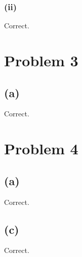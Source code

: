 \documentclass{article}
\begin{document}
\subsubsection*{(ii)}
Correct.

\section*{Problem 3}
\subsection*{(a)}
Correct.

\section*{Problem 4}
\subsection*{(a)}
Correct.

\subsection*{(c)}
Correct.
\end{document}
